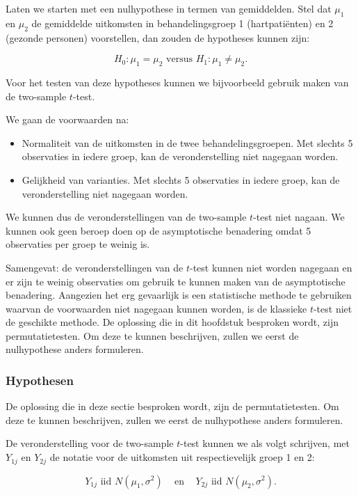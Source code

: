 \documentclass[
  dutch,
  letterpaper,
  12pt]{book}
\providecommand{\tightlist}{%
  \setlength{\itemsep}{0pt}\setlength{\parskip}{0pt}}
\theoremstyle{definition}
\theoremstyle{definition}
\theoremstyle{definition}
\theoremstyle{remark}
\begin{document}
Laten we starten met een nulhypothese in termen van gemiddelden. Stel
dat \(\mu_1\) en \(\mu_2\) de gemiddelde uitkomsten in behandelingsgroep
1 (hartpatiënten) en 2 (gezonde personen) voorstellen, dan zouden de
hypotheses kunnen zijn:

\[H_0: \mu_1=\mu_2 \text{ versus } H_1: \mu_1\neq \mu_2.\]

Voor het testen van deze hypotheses kunnen we bijvoorbeeld gebruik maken
van de two-sample \(t\)-test.

We gaan de voorwaarden na:

\begin{itemize}
\tightlist
\item
  Normaliteit van de uitkomsten in de twee behandelingsgroepen. Met
  slechts 5 observaties in iedere groep, kan de veronderstelling niet
  nagegaan worden.
\item
  Gelijkheid van varianties. Met slechts 5 observaties in iedere groep,
  kan de veronderstelling niet nagegaan worden.
\end{itemize}

We kunnen dus de veronderstellingen van de two-sample \(t\)-test niet
nagaan. We kunnen ook geen beroep doen op de asymptotische benadering
omdat 5 observaties per groep te weinig is.

Samengevat: de veronderstellingen van de \(t\)-test kunnen niet worden
nagegaan en er zijn te weinig observaties om gebruik te kunnen maken van
de asymptotische benadering. Aangezien het erg gevaarlijk is een
statistische methode te gebruiken waarvan de voorwaarden niet nagegaan
kunnen worden, is de klassieke \(t\)-test niet de geschikte methode. De
oplossing die in dit hoofdstuk besproken wordt, zijn permutatietesten.
Om deze te kunnen beschrijven, zullen we eerst de nulhypothese anders
formuleren.

\subsubsection{Hypothesen}\label{hypothesen}

De oplossing die in deze sectie besproken wordt, zijn de
permutatietesten. Om deze te kunnen beschrijven, zullen we eerst de
nulhypothese anders formuleren.

De veronderstelling voor de two-sample \(t\)-test kunnen we als volgt
schrijven, met \(Y_{1j}\) en \(Y_{2j}\) de notatie voor de uitkomsten
uit respectievelijk groep 1 en 2:

\[Y_{1j} \text{ iid } N(\mu_1,\sigma^2) \;\;\;\text{ en }\;\;\; Y_{2j} \text{ iid } N(\mu_2,\sigma^2).\]
\end{document}
